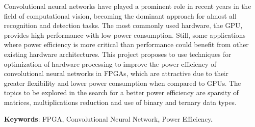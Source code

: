 \documentclass[
    12pt,                       %
    oneside,                    %
    a4paper,                    %
    brazil,                     %
    french,                     %
    spanish,                    %
    english,                    %
    ]{abntex2}
\begin{document}

\frenchspacing


\imprimircapa

\imprimirfolhaderosto



\begin{resumo}
     Convolutional neural networks have played a prominent role in recent years in the field of computational vision, becoming the dominant approach for almost all recognition and detection tasks.
     The most commonly used hardware, the GPU, provides high performance with low power consumption. Still, some applications where power efficiency is more critical than performance could benefit from other existing hardware architectures.
     This project proposes to use techniques for optimization of hardware processing to improve the power efficiency of convolutional neural networks in FPGAs, which are attractive due to their greater flexibility and lower power consumption when compared to GPUs.
     The topics to be explored in the search for a better power efficiency are sparsity of matrices, multiplications reduction and use of binary and ternary data types.

   \vspace{\onelineskip}
   \noindent
   \textbf{Keywords}: FPGA, Convolutional Neural Network, Power Efficiency.
\end{resumo}
\end{document}
